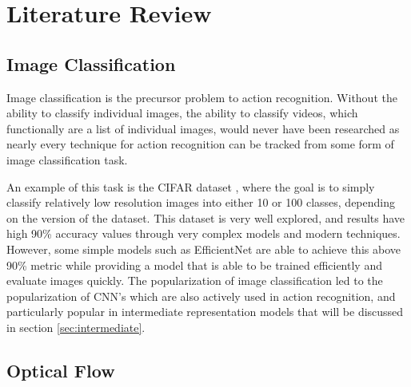 
\chapter{Literature Review} %

\label{LiteratureReview} %

\section{Image Classification}

Image classification is the precursor problem to action recognition. Without the ability to classify individual images, the ability to classify videos, which functionally are a list of individual images, would never have been researched as nearly every technique for action recognition can be tracked from some form of image classification task.

An example of this task is the CIFAR dataset \cite{cifar}, where the goal is to simply classify relatively low resolution images into either 10 or 100 classes, depending on the version of the dataset. This dataset is very well explored, and results have high 90\% accuracy values through very complex models and modern techniques. However, some simple models such as EfficientNet \cite{efficientnet} are able to achieve this above 90\% metric while providing a model that is able to be trained efficiently and evaluate images quickly. The popularization of image classification led to the popularization of CNN's which are also actively used in action recognition, and particularly popular in intermediate representation models that will be discussed in section \ref{sec:intermediate}.

\section{Optical Flow}

